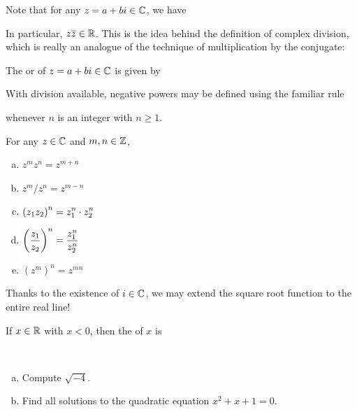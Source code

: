\documentclass[11pt,fleqn,dvipsnames,usenames]{article}
\newcommand{\p}{\noindent}
\begin{document}
\p Note that for any $z = a + bi\in\mathbb{C}$, we have
\vspace{2cm}

\p In particular, $z\overline{z}\in\mathbb{R}$.  This is the idea behind the definition of complex division, which is really an analogue of the technique of {multiplication by the conjugate}:
\vfill

\begin{definition}
The  or  of $z = a+bi\in\mathbb{C}$ is given by
\end{definition}
\newpage

\p With division available, negative powers may be defined using the familiar rule
\vspace{2cm}

\p whenever $n$ is an integer with $n\geq 1$.
\vsp

\properties For any $z\in\mathbb{C}$ and $m,n\in\mathbb{Z}$,
\begin{enumerate}[(a)]
\item $z^{m}z^{n} = z^{m+n}$
\item $z^{m}/z^{n} = z^{m-n}$
\item $\displaystyle{\left(z_{1}z_{2}\right)^{n} = z_{1}^{n}\cdot z_{2}^{n}}$
\item $\displaystyle{\left(\frac{z_{1}}{z_{2}}\right)^{n} = \frac{z_{1}^{n}}{z_{2}^{n}}}$
\item $\left(z^{m}\right)^{n} = z^{mn}$
\end{enumerate}
\vsp

\p Thanks to the existence of $i\in\mathbb{C}$, we may extend the square root function to the entire real line!
\vsp

\begin{definition}
If $x\in\mathbb{R}$ with $x < 0$, then the  of $x$ is
\end{definition}
\vsp

\begin{examples}~
\begin{enumerate}[(a)]
\item Compute $\sqrt{-4}$.
\item Find all solutions to the quadratic equation $x^2 + x + 1 = 0$.
\end{enumerate}
\end{examples}
%
\begin{solution}
\newpage

\end{solution}
\end{document}
